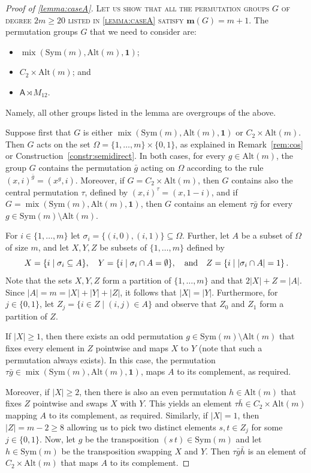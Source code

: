 \documentclass[a4paper]{amsart}
\newcommand{\Sym}{\mathrm{Sym}}
\newcommand{\Alt}{\mathrm{Alt}}
\newcommand{\m}{\mathbf{m}}
\newcommand{\mix}{\mathop{\mathrm{mix}}}
\newcommand{\A}{\mathsf{A}}
\newcommand{\one}{\mathbf{1}}
\theoremstyle{definition}
\begin{document}
\begin{proof}[Proof of \cref{lemma:caseA}]
\smallskip
\noindent \textsc{Let us show that all the permutation groups $G$ of degree $2m\ge 20$
listed in \cref{lemma:caseA} satisfy
$\m(G) = m+1$.}
The permutation groups $G$ that we need to consider are:
\begin{itemize}
    \item $\mix(\Sym(m),\Alt(m),\one)$;
    \item $C_2 \times \Alt(m)$; and
    \item $\A \rtimes M_{12}$.
\end{itemize}
Namely, all other groups listed in the lemma are overgroups of the above.

Suppose first that $G$ is either $\mix(\Sym(m),\Alt(m),\one)$
or $C_2\times \Alt(m)$. Then $G$ acts 
on the set $\Omega=\{1,\ldots,m\}\times \{0,1
\}$, as explained in Remark~\ref{rem:cos} or Construction~\ref{constr:semidirect}.
In both cases, for every $g\in \Alt(m)$, 
the group $G$ contains the permutation
$\bar{g}$ acting on $\Omega$ according to the rule $(x,i)^{\bar{g}} = (x^g,i)$. Moreover,
if $G=C_2\times \Alt(m)$, then $G$ contains
also the central permutation $\tau$, defined by
$(x,i)^\tau = (x,1-i)$, and if $G=\mix(\Sym(m),\Alt(m),\one)$, then
$G$ contains an element $\tau\bar{g}$ for every
$g\in \Sym(m)\setminus \Alt(m)$.

For $i\in \{1,\ldots,m\}$ let $\sigma_i = \{(i,0),(i,1)\} \subseteq \Omega$.
Further, let $A$ be a subset of $\Omega$ of size $m$, and let $X,Y,Z$ be subsets of $\{1,\ldots,m\}$ defined by
\[X =\{i \mid  \sigma_i \subseteq A\} , \quad Y =\{i \mid \sigma_i \cap A =\emptyset\} , \quad \hbox{and} \quad   Z =\{i \mid |\sigma_i \cap A| =1\} \,.\]
Note that the sets $X,Y,Z$ form a partition of
$\{1,\ldots,m\}$ and that $2|X|+Z = |A|$.
Since $|A| = m = |X|+|Y|+|Z|$,
it follows that $|X| = |Y|$.
Furthermore, for $j\in \{0,1\}$,
let $Z_j = \{i \in Z \mid (i,j) \in A\}$
and observe that $Z_0$ and $Z_1$ form
a partition of $Z$.

If $|X| \ge 1$, then there exists an odd permutation $g\in \Sym(m)\setminus \Alt(m)$
that fixes every element in $Z$ pointwise
and maps $X$ to $Y$ (note that such a permutation always exists).
In this case, the permutation $\tau\bar{g} \in \mix(\Sym(m),\Alt(m),\one)$,
maps $A$ to its complement, as required.

Moreover, if $|X|\ge 2$, then there is also
an even permutation $h\in \Alt(m)$ that
fixes $Z$ pointwise and swaps $X$ with $Y$.
This yields an element $\tau\bar{h}\in C_2\times \Alt(m)$ mapping $A$ to its complement, as required. Similarly, if $|X| = 1$,
then $|Z| = m-2 \ge 8$ allowing us to pick
two distinct elements $s,t \in Z_j$ for some $j\in \{0,1\}$.
Now, let $g$ be the transposition $(s\, t)\in \Sym(m)$ and let $h \in \Sym(m)$ be the transposition swapping $X$ and $Y$.
Then $\tau \bar{g}\bar{h}$ is an element of $C_2\times \Alt(m)$ that maps $A$ to its complement.


\end{proof}
\end{document}
